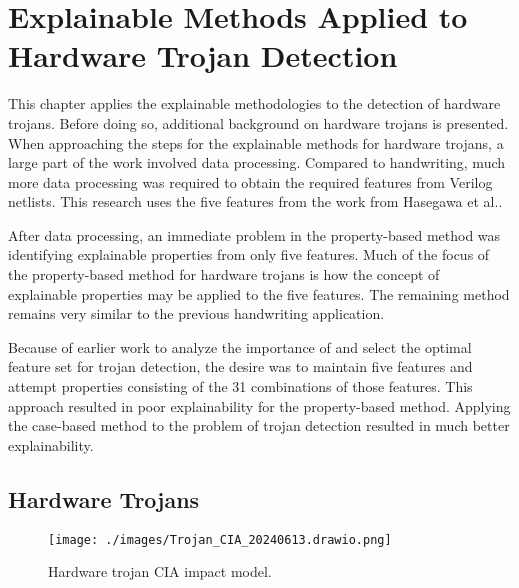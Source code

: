 \chapter{Explainable Methods Applied to Hardware Trojan Detection} \label{ch:trojan}

This chapter applies the explainable methodologies to the detection of hardware
trojans. Before doing so, additional background on hardware trojans is
presented. When approaching the steps for the explainable methods for hardware
trojans, a large part of the work involved data processing. Compared to
handwriting, much more data processing was required to obtain the required
features from Verilog netlists. This research uses the five features from the
work from Hasegawa et al.\cite{7604700}.

After data processing, an immediate problem in the property-based method was
identifying explainable properties from only five features. Much of the focus of
the property-based method for hardware trojans is how the concept of explainable
properties may be applied to the five features. The remaining method remains
very similar to the previous handwriting application.

Because of earlier work to analyze the importance of and select the optimal
feature set for trojan detection\cite{7604700, hasegawa2020hardware}, the desire
was to maintain five features and attempt properties consisting of the 31
combinations of those features. This approach resulted in poor explainability
for the property-based method. Applying the case-based method to the problem of
trojan detection resulted in much better explainability.

\section{Hardware Trojans}

\begin{figure}[H]
    \texttt{[image: ./images/Trojan\_CIA\_20240613.drawio.png]}
    \caption{Hardware trojan CIA impact model.}
    \label{fig:cia_impact_model}
\end{figure}

